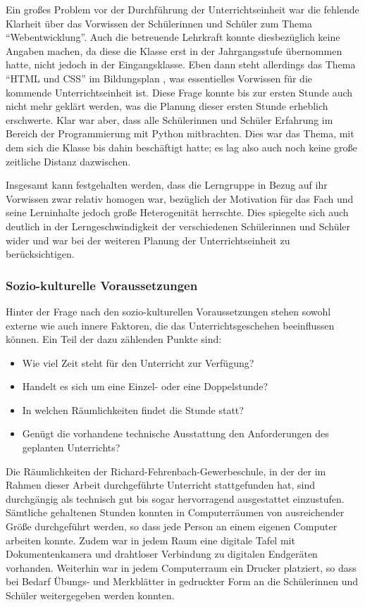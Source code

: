 Ein großes Problem vor der Durchführung der Unterrichtseinheit war die fehlende Klarheit über das Vorwissen der Schülerinnen und Schüler zum Thema ``Webentwicklung''.
Auch die betreuende Lehrkraft konnte diesbezüglich keine Angaben machen, da diese die Klasse erst in der Jahrgangsstufe übernommen hatte, nicht jedoch in der Eingangsklasse.
Eben dann steht allerdings das Thema ``HTML und CSS'' im Bildungsplan \cite[BPE~2]{bildungsplan-tg-informatik}, was essentielles Vorwissen für die kommende Unterrichtseinheit ist.
Diese Frage konnte bis zur ersten Stunde auch nicht mehr geklärt werden, was die Planung dieser ersten Stunde erheblich erschwerte.
Klar war aber, dass alle Schülerinnen und Schüler Erfahrung im Bereich der Programmierung mit Python mitbrachten.
Dies war das Thema, mit dem sich die Klasse bis dahin beschäftigt hatte; es lag also auch noch keine große zeitliche Distanz dazwischen.

Insgesamt kann festgehalten werden, dass die Lerngruppe in Bezug auf ihr Vorwissen zwar relativ homogen war, bezüglich der Motivation für das Fach und seine Lerninhalte jedoch große Heterogenität herrschte.
Dies spiegelte sich auch deutlich in der Lerngeschwindigkeit der verschiedenen Schülerinnen und Schüler wider und war bei der weiteren Planung der Unterrichtseinheit zu berücksichtigen.

\subsubsection{Sozio-kulturelle Voraussetzungen}
\label{subsubsec:sozio-kulturelle-voraussetzungen}

Hinter der Frage nach den sozio-kulturellen Voraussetzungen stehen sowohl externe wie auch innere Faktoren, die das Unterrichtsgeschehen beeinflussen können. Ein Teil der dazu zählenden Punkte sind:
\begin{itemize}
	\item Wie viel Zeit steht für den Unterricht zur Verfügung?
	\item Handelt es sich um eine Einzel- oder eine Doppelstunde?
	\item In welchen Räumlichkeiten findet die Stunde statt?
	\item Genügt die vorhandene technische Ausstattung den Anforderungen des geplanten Unterrichts?
\end{itemize}
Die Räumlichkeiten der Richard-Fehrenbach-Gewerbeschule, in der der im Rahmen dieser Arbeit durchgeführte Unterricht stattgefunden hat, sind durchgängig als technisch gut bis sogar hervorragend ausgestattet einzustufen.
Sämtliche gehaltenen Stunden konnten in Computerräumen von ausreichender Größe durchgeführt werden, so dass jede Person an einem eigenen Computer arbeiten konnte.
Zudem war in jedem Raum eine digitale Tafel mit Dokumentenkamera und drahtloser Verbindung zu digitalen Endgeräten vorhanden.
Weiterhin war in jedem Computerraum ein Drucker platziert, so dass bei Bedarf Übungs- und Merkblätter in gedruckter Form an die Schülerinnen und Schüler weitergegeben werden konnten.

